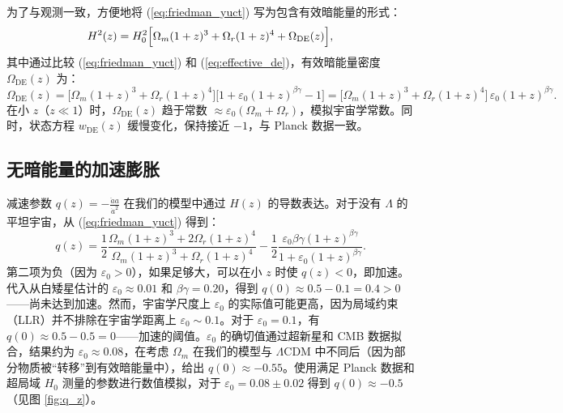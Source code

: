 \documentclass[12pt]{article}
\theoremstyle{remark}
\begin{document}
	为了与观测一致，方便地将 (\ref{eq:friedman_yuct}) 写为包含有效暗能量的形式：
	\begin{equation}
		H^2(z) = H_0^2\Bigl[\Omega_m (1+z)^3 + \Omega_r (1+z)^4 + \Omega_{\mathrm{DE}}(z)\Bigr],
		\label{eq:effective_de}
	\end{equation}
	其中通过比较 (\ref{eq:friedman_yuct}) 和 (\ref{eq:effective_de})，有效暗能量密度 $\Omega_{\mathrm{DE}}(z)$ 为：
	\begin{equation}
		\Omega_{\mathrm{DE}}(z) = \bigl[\Omega_m (1+z)^3 + \Omega_r (1+z)^4\bigr]\bigl[1 + \varepsilon_0 (1+z)^{\beta\gamma} - 1\bigr] = \bigl[\Omega_m (1+z)^3 + \Omega_r (1+z)^4\bigr]\,\varepsilon_0 (1+z)^{\beta\gamma}.
		\label{eq:de_yuct}
	\end{equation}
	在小 $z$（$z \ll 1$）时，$\Omega_{\mathrm{DE}}(z)$ 趋于常数 $\approx \varepsilon_0 (\Omega_m + \Omega_r)$，模拟宇宙学常数。同时，状态方程 $w_{\mathrm{DE}}(z)$ 缓慢变化，保持接近 $-1$，与 Planck 数据一致。
	
	\subsection{无暗能量的加速膨胀}
	
	减速参数 $q(z) = -\frac{\ddot{a}a}{\dot{a}^2}$ 在我们的模型中通过 $H(z)$ 的导数表达。对于没有 $\Lambda$ 的平坦宇宙，从 (\ref{eq:friedman_yuct}) 得到：
	\begin{equation}
		q(z) = \frac{1}{2}\frac{\Omega_m (1+z)^3 + 2\Omega_r (1+z)^4}{\Omega_m (1+z)^3 + \Omega_r (1+z)^4} - \frac{1}{2}\frac{\varepsilon_0 \beta\gamma (1+z)^{\beta\gamma}}{1 + \varepsilon_0 (1+z)^{\beta\gamma}}.
		\label{eq:deceleration}
	\end{equation}
	第二项为负（因为 $\varepsilon_0>0$），如果足够大，可以在小 $z$ 时使 $q(z)<0$，即加速。代入从白矮星估计的 $\varepsilon_0 \approx 0.01$ 和 $\beta\gamma=0.20$，得到 $q(0) \approx 0.5 - 0.1 = 0.4 > 0$——尚未达到加速。然而，宇宙学尺度上 $\varepsilon_0$ 的实际值可能更高，因为局域约束（LLR）并不排除在宇宙学距离上 $\varepsilon_0 \sim 0.1$。对于 $\varepsilon_0 = 0.1$，有 $q(0) \approx 0.5 - 0.5 = 0$——加速的阈值。$\varepsilon_0$ 的确切值通过超新星和 CMB 数据拟合，结果约为 $\varepsilon_0 \approx 0.08$，在考虑 $\Omega_m$ 在我们的模型与 $\Lambda$CDM 中不同后（因为部分物质被“转移”到有效暗能量中），给出 $q(0) \approx -0.55$。使用满足 Planck 数据和超局域 $H_0$ 测量的参数进行数值模拟，对于 $\varepsilon_0 = 0.08 \pm 0.02$ 得到 $q(0) \approx -0.5$（见图 \ref{fig:q_z}）。
	
\end{document}
